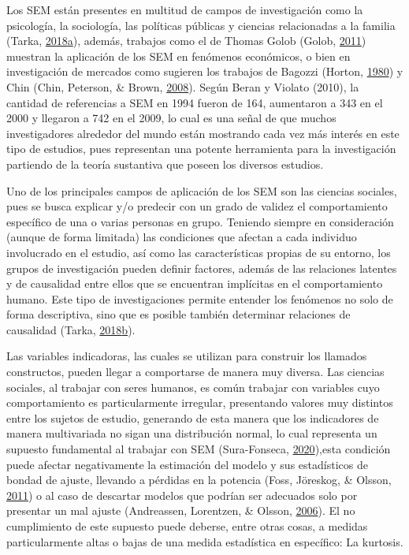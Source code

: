 \documentclass[
]{article}
\begin{document}
Los SEM están presentes en multitud de campos de investigación como la
psicología, la sociología, las políticas públicas y ciencias
relacionadas a la familia (Tarka,
\protect\hyperlink{ref-tarka}{2018}\protect\hyperlink{ref-tarka}{a}),
además, trabajos como el de Thomas Golob (Golob,
\protect\hyperlink{ref-golob}{2011}) muestran la aplicación de los SEM
en fenómenos económicos, o bien en investigación de mercados como
sugieren los trabajos de Bagozzi (Horton,
\protect\hyperlink{ref-bagozzi}{1980}) y Chin (Chin, Peterson, \& Brown,
\protect\hyperlink{ref-chin}{2008}). Según Beran y Violato (2010), la
cantidad de referencias a SEM en 1994 fueron de 164, aumentaron a 343 en
el 2000 y llegaron a 742 en el 2009, lo cual es una señal de que muchos
investigadores alrededor del mundo están mostrando cada vez más interés
en este tipo de estudios, pues representan una potente herramienta para
la investigación partiendo de la teoría sustantiva que poseen los
diversos estudios.

Uno de los principales campos de aplicación de los SEM son las ciencias
sociales, pues se busca explicar y/o predecir con un grado de validez el
comportamiento específico de una o varias personas en grupo. Teniendo
siempre en consideración (aunque de forma limitada) las condiciones que
afectan a cada individuo involucrado en el estudio, así como las
características propias de su entorno, los grupos de investigación
pueden definir factores, además de las relaciones latentes y de
causalidad entre ellos que se encuentran implícitas en el comportamiento
humano. Este tipo de investigaciones permite entender los fenómenos no
solo de forma descriptiva, sino que es posible también determinar
relaciones de causalidad (Tarka,
\protect\hyperlink{ref-Tarka}{2018}\protect\hyperlink{ref-Tarka}{b}).

Las variables indicadoras, las cuales se utilizan para construir los
llamados constructos, pueden llegar a comportarse de manera muy diversa.
Las ciencias sociales, al trabajar con seres humanos, es común trabajar
con variables cuyo comportamiento es particularmente irregular,
presentando valores muy distintos entre los sujetos de estudio,
generando de esta manera que los indicadores de manera multivariada no
sigan una distribución normal, lo cual representa un supuesto
fundamental al trabajar con SEM (Sura-Fonseca,
\protect\hyperlink{ref-sura}{2020}),esta condición puede afectar
negativamente la estimación del modelo y sus estadísticos de bondad de
ajuste, llevando a pérdidas en la potencia (Foss, Jöreskog, \& Olsson,
\protect\hyperlink{ref-foss}{2011}) o al caso de descartar modelos que
podrían ser adecuados solo por presentar un mal ajuste (Andreassen,
Lorentzen, \& Olsson, \protect\hyperlink{ref-andreassen}{2006}). El no
cumplimiento de este supuesto puede deberse, entre otras cosas, a
medidas particularmente altas o bajas de una medida estadística en
específico: La kurtosis.
\end{document}
